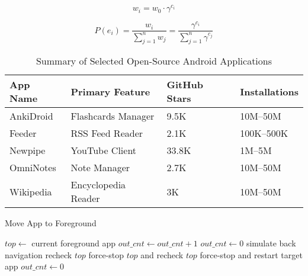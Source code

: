 \documentclass[
	letterpaper, %
	10pt, %
]{article} %
\begin{document}
\[
w_i = w_0 \cdot \gamma^{c_i}
\]

\[
P(e_i) = \frac{w_i}{\sum_{j=1}^{n} w_j} = \frac{\gamma^{c_i}}{\sum_{j=1}^{n} \gamma^{c_j}}
\]

\begin{table}[ht]
\centering
\caption{Summary of Selected Open-Source Android Applications}
\label{tab:app-dataset}
\begin{tabular}{@{}llll@{}}
\toprule
App Name    & Primary Feature        & GitHub Stars & Installations \\ 
\midrule
AnkiDroid   & Flashcards Manager     & 9.5K         & 10M–50M       \\
Feeder      & RSS Feed Reader        & 2.1K         & 100K–500K     \\
Newpipe     & YouTube Client         & 33.8K        & 1M–5M         \\
OmniNotes   & Note Manager           & 2.7K         & 10M–50M       \\
Wikipedia   & Encyclopedia Reader    & 3K           & 10M–50M       \\
\bottomrule
\end{tabular}
\end{table}

\begin{algorithm}[H]
\caption{Move App to Foreground}
\label{alg:move-app}
\begin{algorithmic}[1]
    \State $top \gets$ current foreground app
        \State $out\_cnt \gets out\_cnt + 1$
            \State $out\_cnt \gets 0$
            \State simulate back navigation
            \State recheck $top$
                \State force-stop $top$ and recheck $top$
                    \State force-stop and restart target app
                \EndIf
            \EndIf
        \EndIf
    \Else
        \State $out\_cnt \gets 0$
    \EndIf
\EndFunction
\end{algorithmic}
\end{algorithm}
\end{document}
